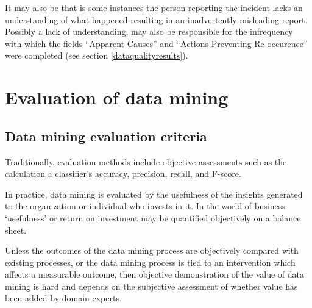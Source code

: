 It may also be that is some instances the person reporting the incident lacks an understanding of what happened resulting in an inadvertently misleading report.\cite{Cassidy2011} Possibly a lack of understanding, may also be responsible for the infrequency with which the fields ``Apparent Causes'' and ``Actions Preventing Re-occurence'' were completed (see section \ref{dataqualityresults}).


\begin{comment}

http://ars.to/OuOYPi netflix chaos monkey

Discovering useful new knowledge without expert input is a 
Classification does involve a type of analysis but a type that greatly
constrains the insights that can be obtained from the data.  Typically, when
classification systems are used as the analysis, a report of an incident is
assigned, through a procedure or set of criteria, into one or another fixed
category. The category set is thought to capture or exhaust all of the
relevant aspects of failures.  Once the report is classified the narrative
is lost or downplayed.  Instead, tabulations are built up and put into
statistical comparisons. Put simply, once assigned to a single category, one
event is precisely, and indistinguishably like all the others in that category.  \cite{Billings1998}
Current market forces are not adequately addressing the potential risks associated with use of health IT.\cite{nationalization}

\end{comment}


\section{Evaluation of data mining}
\subsection{Data mining evaluation criteria}
Traditionally, evaluation methods include objective assessments such as the calculation a classifier's \gls{accuracy}, \gls{precision}, \gls{recall}, and \gls{F-score}. 

In practice, data mining is evaluated by the usefulness of the insights generated to the organization or individual who invests in it. In the world of business `usefulness' or return on investment may be quantified objectively on a balance sheet. \cite{Hand2001}\cite{Bentham2012} 

Unless the outcomes of the data mining process are objectively compared with existing processes, or the data mining process is tied to an intervention which affects a measurable outcome, then objective demonstration of the value of data mining is hard and depends on the subjective assessment of whether value has been added by domain experts.\cite{Ong2010}\cite{Ong2012}\cite{Bentham2012}

